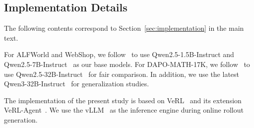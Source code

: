 \documentclass[]{youtu} %
\begin{document}
\subsection{Implementation Details}
\label{sec:implementation_detail_appdx}


The following contents correspond to Section~\ref{sec:implementation} in the main text.


For ALFWorld and WebShop,
we follow~\cite{feng2025group} to use Qwen2.5-1.5B-Instruct and Qwen2.5-7B-Instruct~\cite{yang2024qwen2} as our base models.
For DAPO-MATH-17K,
we follow~\cite{feng2025retool} to use Qwen2.5-32B-Instruct~\cite{yang2024qwen2} for fair comparison.
In addition,
we use the latest Qwen3-32B-Instruct~\cite{yang2025qwen3} for generalization studies.



The implementation of the present study is based on VeRL~\cite{sheng2024hybridflow} and its extension VeRL-Agent~\cite{feng2025group}.
We use the vLLM~\cite{kwon2023efficient} as the inference engine during online rollout generation.
\end{document}

